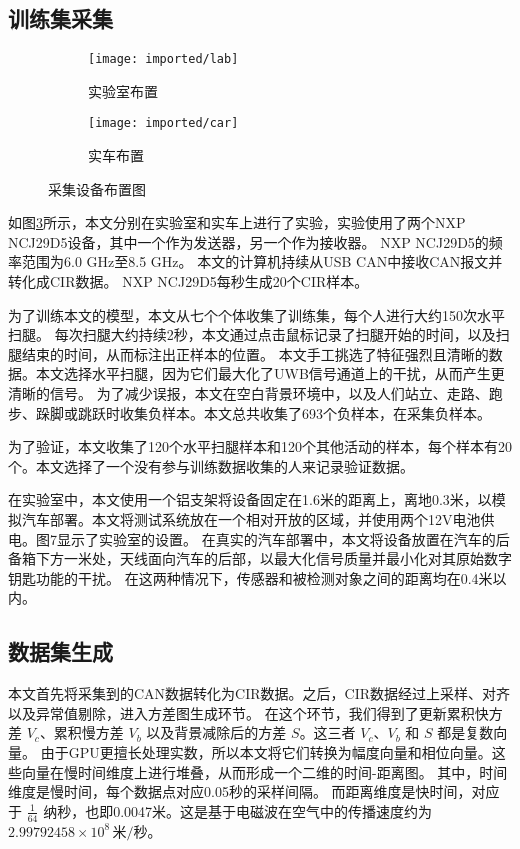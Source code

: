 \subsection{训练集采集}
\begin{figure}[htbp]
    \centering
    \begin{subfigure}{0.45\textwidth}
        \centering
        \texttt{[image: imported/lab]}
        \caption{\label{fig:lab}实验室布置}
    \end{subfigure}%
    \centering
    \begin{subfigure}{0.45\textwidth}
        \centering
        \texttt{[image: imported/car]}
        \caption{\label{fig:car}实车布置}
    \end{subfigure}%
    \caption{采集设备布置图}
    \label{fig:lab_car_setup}
\end{figure}
如图\ref{fig:lab_car_setup}所示，本文分别在实验室和实车上进行了实验，实验使用了两个NXP NCJ\-29D5设备，其中一个作为发送器，另一个作为接收器。
NXP NCJ29D5的频率范围为6.0 GHz至8.5 GHz。
本文的计算机持续从USB CAN中接收CAN报文并转化成CIR数据。
NXP NCJ29D5每秒生成20个CIR样本。

为了训练本文的模型，本文从七个个体收集了训练集，每个人进行大约150次水平扫腿。
每次扫腿大约持续2秒，本文通过点击鼠标记录了扫腿开始的时间，以及扫腿结束的时间，从而标注出正样本的位置。
本文手工挑选了特征强烈且清晰的数据。本文选择水平扫腿，因为它们最大化了UWB信号通道上的干扰，从而产生更清晰的信号。
为了减少误报，本文在空白背景环境中，以及人们站立、走路、跑步、跺脚或跳跃时收集负样本。本文总共收集了693个负样本，在采集负样本。

为了验证，本文收集了120个水平扫腿样本和120个其他活动的样本，每个样本有20个。本文选择了一个没有参与训练数据收集的人来记录验证数据。

在实验室中，本文使用一个铝支架将设备固定在1.6米的距离上，离地0.3米，以模拟汽车部署。本文将测试系统放在一个相对开放的区域，并使用两个12V电池供电。图7显示了实验室的设置。
在真实的汽车部署中，本文将设备放置在汽车的后备箱下方一米处，天线面向汽车的后部，以最大化信号质量并最小化对其原始数字钥匙功能的干扰。
在这两种情况下，传感器和被检测对象之间的距离均在0.4米以内。

\subsection{数据集生成}
本文首先将采集到的CAN数据转化为CIR数据。之后，CIR数据经过上采样、对齐以及异常值剔除，进入方差图生成环节。
在这个环节，我们得到了更新累积快方差 \(V_c\)、累积慢方差 \(V_b\) 以及背景减除后的方差 \(S\)。这三者 \(V_c\)、\(V_b\) 和 \(S\) 都是复数向量。
由于GPU更擅长处理实数，所以本文将它们转换为幅度向量和相位向量。这些向量在慢时间维度上进行堆叠，从而形成一个二维的时间-距离图。
其中，时间维度是慢时间，每个数据点对应0.05秒的采样间隔。
而距离维度是快时间，对应于 \( \frac{1}{64} \) 纳秒，也即0.0047米。这是基于电磁波在空气中的传播速度约为 \(2.99792458 \times 10^8 \, \text{米/秒}\)。


